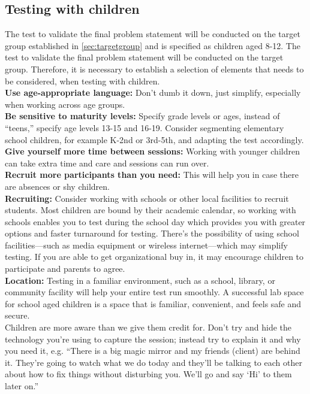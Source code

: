 \subsection{Testing with children}
The test to validate the final problem statement will be conducted on the target group established in \autoref{sec:targetgroup} and is specified as children aged 8-12. The test to validate the final problem statement will be conducted on the target group. Therefore, it is necessary to establish a selection of elements that needs to be considered, when testing with children.\\

\textbf{Use age-appropriate language:} Don’t dumb it down, just simplify, especially when working across age groups\cite{testwithkids}.\\

\textbf{Be sensitive to maturity levels:} Specify grade levels or ages, instead of “teens,” specify age levels 13-15 and 16-19. Consider segmenting elementary school children, for example K-2nd or 3rd-5th, and adapting the test accordingly\cite{testwithkids}.\\

\textbf{Give yourself more time between sessions:} Working with younger children can take extra time and care and sessions can run over.\cite{testwithkids}\\

\textbf{Recruit more participants than you need:} This will help you in case there are absences or shy children\cite{testwithkids}.\\

\textbf{Recruiting:} Consider working with schools or other local facilities to recruit students. Most children are bound by their academic calendar, so working with schools enables you to test during the school day which provides you with greater options and faster turnaround for testing.  There’s the possibility of using school facilities—such as media equipment or wireless internet—which may simplify testing.  If you are able to get organizational buy in, it may encourage children to participate and parents to agree\cite{testwithkids}.\\

\textbf{Location:} Testing in a familiar environment, such as a school, library, or community facility will help your entire test run smoothly. A successful lab space for school aged children is a space that is familiar, convenient, and feels safe and secure\cite{testwithkids}.\\

Children are more aware than we give them credit for. Don’t try and hide the technology you’re using to capture the session; instead try to explain it and why you need it, e.g.
“There is a big magic mirror and my friends (client) are behind it. They’re going to watch what we do today and they’ll be talking to each other about how to fix things without disturbing you. We’ll go and say ‘Hi’ to them later on.”\cite{testwithkids}\\



